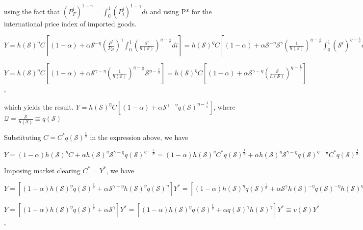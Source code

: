 \documentclass[
]{article}
\begin{document}
using the fact that
\(\left( P_F^i \right)^{1-\gamma} = \displaystyle \int_0^1 \left( P_i^i \right)^{1-\gamma}di\)
and using P* for the international price index of imported goods.

\(\displaystyle Y = h(\mathcal{S})^{\eta}C \left[ (1-\alpha) + \alpha \mathcal{S}^{-\eta} \left( \frac{P^*}{P_H} \right)^{\gamma} \int_0^1 \left( \frac{\mathcal{S}^i}{h(\mathcal{S})} \right)^{\eta-\frac{1}{\sigma}} di \right] =h(\mathcal{S})^{\eta}C \left[ (1-\alpha) + \alpha \mathcal{S}^{-\eta} \mathcal{S}^\gamma \left( \frac{1}{h(\mathcal{S})} \right)^{\eta-\frac{1}{\sigma}} \int_0^1 ( \mathcal{S}^i )^{\eta-\frac{1}{\sigma}} di \right]\)

\(\displaystyle Y = h(\mathcal{S})^{\eta}C \left[ (1-\alpha) + \alpha \mathcal{S}^{\gamma-\eta} \left( \frac{1}{h(\mathcal{S})} \right)^{\eta-\frac{1}{\sigma}} \mathcal{S} ^{\eta-\frac{1}{\sigma}} \right] = h(\mathcal{S})^{\eta}C \left[ (1-\alpha) + \alpha \mathcal{S}^{\gamma-\eta} \left( \frac{\mathcal{S}}{h(\mathcal{S})} \right)^{\eta-\frac{1}{\sigma}} \right]\),

which yields the result.
\(\displaystyle Y= h(\mathcal{S})^{\eta}C \left[ (1-\alpha) + \alpha \mathcal{S}^{\gamma-\eta} q(\mathcal{S})^{\eta-\frac{1}{\sigma}} \right]\),
where
\(\displaystyle \mathcal{Q}=\frac{\mathcal{S}}{h(\mathcal{S})} \equiv q(\mathcal{S})\)

Substituting \(\displaystyle C = C^*q(\mathcal{S})^\frac{1}{\sigma}\) in
the expression above, we have

\(\displaystyle Y= (1-\alpha)h(\mathcal{S})^{\eta}C + \alpha h(\mathcal{S})^{\eta} \mathcal{S}^{\gamma-\eta} q(\mathcal{S})^{\eta-\frac{1}{\sigma}} = (1-\alpha)h(\mathcal{S})^{\eta} C^*q(\mathcal{S})^\frac{1}{\sigma} + \alpha h(\mathcal{S})^{\eta} \mathcal{S}^{\gamma-\eta} q(\mathcal{S})^{\eta-\frac{1}{\sigma}} C^*q(\mathcal{S})^\frac{1}{\sigma}\)

Imposing market clearing \(C^*=Y^*\), we have

\(\displaystyle Y=\left[ (1-\alpha)h(\mathcal{S})^{\eta} q(\mathcal{S})^\frac{1}{\sigma} + \alpha \mathcal{S}^{\gamma-\eta} h(\mathcal{S})^{\eta} q(\mathcal{S})^{\eta} \right]Y^* = \left[ (1-\alpha)h(\mathcal{S})^{\eta} q(\mathcal{S})^\frac{1}{\sigma} + \alpha \mathcal{S}^{\gamma} h(\mathcal{S})^{-\eta} q(\mathcal{S})^{-\eta} h(\mathcal{S})^{\eta} q(\mathcal{S})^{\eta} \right]Y^*\)

\(\displaystyle Y= \left[ (1-\alpha)h(\mathcal{S})^{\eta} q(\mathcal{S})^\frac{1}{\sigma} + \alpha \mathcal{S}^{\gamma} \right]Y^* = \left[ (1-\alpha)h(\mathcal{S})^{\eta} q(\mathcal{S})^\frac{1}{\sigma} + \alpha q(\mathcal{S})^{\gamma} h(\mathcal{S})^{\gamma} \right]Y^* \equiv v (\mathcal{S})Y^*\),
\end{document}
